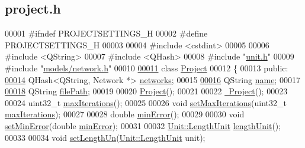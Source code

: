 \hypertarget{project_8h_source}{}\subsection{project.\+h}
\label{project_8h_source}

\begin{DoxyCode}
00001 \textcolor{preprocessor}{#ifndef PROJECTSETTINGS\_H}
00002 \textcolor{preprocessor}{#define PROJECTSETTINGS\_H}
00003 
00004 \textcolor{preprocessor}{#include <cstdint>}
00005 
00006 \textcolor{preprocessor}{#include <QString>}
00007 \textcolor{preprocessor}{#include <QHash>}
00008 \textcolor{preprocessor}{#include "\hyperlink{unit_8h}{unit.h}"}
00009 \textcolor{preprocessor}{#include "\hyperlink{network_8h}{models/network.h}"}
00010 
\hypertarget{project_8h_source_l00011}{}\hyperlink{class_project}{00011} \textcolor{keyword}{class }\hyperlink{class_project}{Project}
00012 \{
00013 \textcolor{keyword}{public}:
\hypertarget{project_8h_source_l00014}{}\hyperlink{class_project_aa98126154cab59769a431668e6f17daf}{00014}   QHash<QString, Network *> \hyperlink{class_project_aa98126154cab59769a431668e6f17daf}{networks};
00015 
\hypertarget{project_8h_source_l00016}{}\hyperlink{class_project_a82dd2d1bc38f9fd08c9a811fcaa76b38}{00016}   QString \hyperlink{class_project_a82dd2d1bc38f9fd08c9a811fcaa76b38}{name};
00017 
\hypertarget{project_8h_source_l00018}{}\hyperlink{class_project_a79f30adcefd0b72bd4ac7db724bc9531}{00018}   QString \hyperlink{class_project_a79f30adcefd0b72bd4ac7db724bc9531}{filePath};
00019 
00020   \hyperlink{class_project_aa007ecd17d5bc800e7a956cf666eea21}{Project}();
00021 
00022   \hyperlink{class_project_ad165d61b76ee86ee9c27fd987a2a7b9e}{~Project}();
00023 
00024   uint32\_t \hyperlink{class_project_ab9d6426396a75f2fcaeadcddcd0fac64}{maxIterations}();
00025 
00026   \textcolor{keywordtype}{void} \hyperlink{class_project_af2046a5d542d3e3dd51cb9cb04604e8f}{setMaxIterations}(uint32\_t \hyperlink{class_project_ab9d6426396a75f2fcaeadcddcd0fac64}{maxIterations});
00027 
00028   \textcolor{keywordtype}{double} \hyperlink{class_project_a457ed8d3b0ea5816f928977509f69a34}{minError}();
00029 
00030   \textcolor{keywordtype}{void} \hyperlink{class_project_a2cb776c39adb42a1113bf7887d0d4636}{setMinError}(\textcolor{keywordtype}{double} \hyperlink{class_project_a457ed8d3b0ea5816f928977509f69a34}{minError});
00031 
00032   \hyperlink{class_unit_a8c8921f7b225ad6063b1cb573425b9a0}{Unit::LengthUnit} \hyperlink{class_project_a40cd2f59a4a708897e5997942c046f4d}{lengthUnit}();
00033 
00034   \textcolor{keywordtype}{void} \hyperlink{class_project_a846ee2284b0856d461b35d78d9f8e1d6}{setLengthUn}(\hyperlink{class_unit_a8c8921f7b225ad6063b1cb573425b9a0}{Unit::LengthUnit} unit);

\end{DoxyCode}

